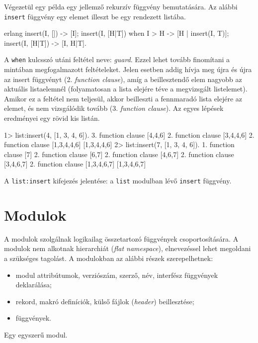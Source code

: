 \documentclass[12pt, a4paper, oneside]{book}
\begin{document}
Végezetül egy példa egy jellemző rekurzív függvény bemutatására. Az alábbi
\texttt{insert} függvény egy elemet illeszt be egy rendezett listába.

\begin{code}{erlang}{}
insert(I, []) ->
  [I];
insert(I, [H|T]) when I > H ->
  [H | insert(I, T)];
insert(I, [H|T]) ->
  [I, H|T].
\end{code}

\noindent A \texttt{when} kulcsszó utáni feltétel neve: \emph{guard}. Ezzel
lehet tovább finomítani a mintában megfogalmazott feltételeket. Jelen esetben
addig hívja meg újra és újra az insert függvényt (2. \emph{function clause}),
amíg a beillesztendő elem nagyobb az aktuális listaelemnél (folyamatosan a
lista elejére téve a megvizsgált listelemet). Amikor ez a feltétel nem
teljesül, akkor beilleszti a fennmaradó lista elejére az elemet, és nem
vizsgálódik tovább (3.  \emph{function clause}). Az egyes lépések eredményei
egy rövid kis listán.

\begin{code}{}{}
1> list:insert(4, [1, 3, 4, 6]).
3. function clause [4,4,6]
2. function clause [3,4,4,6]
2. function clause [1,3,4,4,6]
[1,3,4,4,6]
2> list:insert(7, [1, 3, 4, 6]).
1. function clause [7]
2. function clause [6,7]
2. function clause [4,6,7]
2. function clause [3,4,6,7]
2. function clause [1,3,4,6,7]
[1,3,4,6,7]
\end{code}

\noindent A \texttt{list:insert} kifejezés jelentése: a \texttt{list} modulban
lévő \texttt{insert} függvény. 

\section{Modulok} A modulok szolgálnak logikailag összetartozó függvények
csoportosítására. A modulok nem alkotnak hierarchiát (\emph{flat namespace}),
elnevezéssel lehet megoldani a szükséges tagolást. A modulokban az alábbi
részek szerepelhetnek:

\begin{itemize}
\item modul attribútumok, verziószám, szerző, név, interfész függvények
deklarálása;
\item rekord, makró definíciók, külső fájlok (\emph{header}) beillesztése;
\item függvények.
\end{itemize}

\noindent Egy egyszerű modul.
\end{document}
